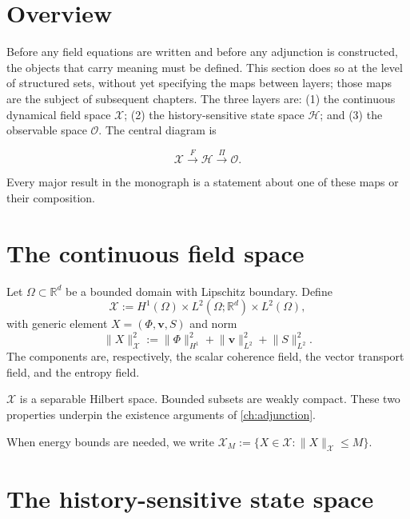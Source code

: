 \documentclass[12pt, oneside]{memoir}
\newcommand{\X}{\mathcal{X}}
\newcommand{\Hcal}{\mathcal{H}}
\newcommand{\OO}{\mathcal{O}}
\newcommand{\nnorm}[1]{\lVert #1 \rVert}
\newcommand{\bv}{\mathbf{v}}
\begin{document}
\section{Overview}

Before any field equations are written and before any adjunction is constructed, the
objects that carry meaning must be defined.  This section does so at the level of
structured sets, without yet specifying the maps between layers; those maps are the
subject of subsequent chapters.  The three layers are: (1) the continuous dynamical field
space $\X$; (2) the history-sensitive state space $\Hcal$; and (3) the observable space
$\OO$.  The central diagram is

\begin{equation}\label{eq:diagram}
  \X \xrightarrow{F} \Hcal \xrightarrow{\Pi} \OO.
\end{equation}

Every major result in the monograph is a statement about one of these maps or their
composition.

\section{The continuous field space}

\begin{definition}
\label{def:X}
Let $\Omega \subset \mathbb{R}^d$ be a bounded domain with Lipschitz boundary.  Define
\[
  \X := H^1(\Omega) \times L^2(\Omega;\mathbb{R}^d) \times L^2(\Omega),
\]
with generic element $X = (\Phi, \bv, S)$ and norm
\[
  \nnorm{X}_\X^2 := \nnorm{\Phi}_{H^1}^2 + \nnorm{\bv}_{L^2}^2 + \nnorm{S}_{L^2}^2.
\]
The components are, respectively, the scalar coherence field, the vector transport field,
and the entropy field.
\end{definition}

$\X$ is a separable Hilbert space.  Bounded subsets are weakly compact.  These two
properties underpin the existence arguments of \cref{ch:adjunction}.

When energy bounds are needed, we write $\X_M := \{X \in \X : \nnorm{X}_\X \le M\}$.

\section{The history-sensitive state space}
\end{document}
